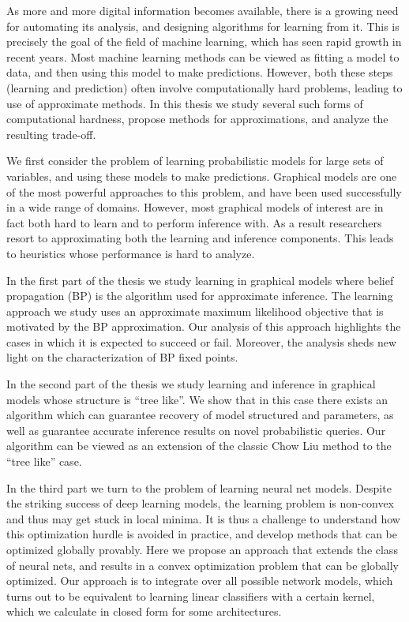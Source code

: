 As more and more digital information becomes available, there is a growing need for automating its analysis, and designing algorithms for learning from it. This is precisely the goal 
of the field of machine learning, which has seen rapid growth in recent years. 
Most machine learning methods can be viewed as fitting a model to data, and then using this model to make predictions. However, both these steps (learning and prediction) often
involve computationally hard problems, leading to use of approximate methods. In this thesis we study several such forms of computational hardness, propose methods
for approximations, and analyze the resulting trade-off.

We first consider the problem of learning probabilistic models for large sets of variables, and using these models to make predictions. Graphical models are one of the most powerful approaches
to this problem, and have been used successfully in a wide range of domains. However, most graphical models of interest are in fact both hard to learn and to perform inference with. As a result
researchers resort to approximating both the learning and inference components. This leads to heuristics whose performance is hard to analyze.

In the first part of the thesis we study learning in graphical models where belief propagation (BP) is the algorithm used for approximate inference. The learning approach we study uses
an approximate maximum likelihood objective that is motivated by the BP approximation. Our analysis of this approach highlights the cases in which it is expected to succeed or fail. Moreover,
the analysis sheds new light on the characterization of BP fixed points. 

In the second part of the thesis we study learning and inference in graphical models whose structure is ``tree like''. We show that in this case there exists an algorithm which can guarantee recovery of model structured and parameters, as well as guarantee accurate inference results on novel probabilistic queries. Our algorithm can be viewed as an extension of the classic Chow Liu method to the ``tree like'' case. 

In the third part we turn to the problem of learning neural net models. Despite the striking success of deep learning models, the learning problem is non-convex and thus may get stuck in local minima. It is thus a challenge to understand how this optimization hurdle is avoided in practice, and develop methods that can be optimized globally provably. Here we propose an approach that
extends the class of neural nets, and results in a convex optimization problem that can be globally optimized. Our approach is to integrate over all possible network models, which turns out to be equivalent to learning linear classifiers with a certain kernel, which we calculate in closed form for some architectures. 

